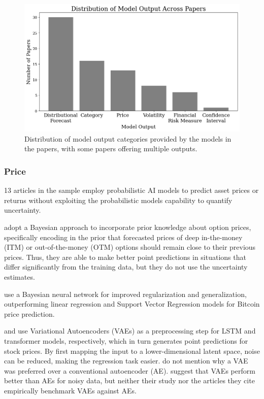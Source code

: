 \begin{figure}[H]
    \centering
    \includegraphics[width=1\linewidth]{Images/model_output.png}
    \caption[Distribution of model output categories in papers]{Distribution of model output categories provided by the models in the papers, with some papers offering multiple outputs.}
    \label{fig:model_output}
\end{figure}

\subsubsection{Price}
13 articles in the sample employ probabilistic AI models to predict asset prices or returns without exploiting the probabilistic models capability to quantify uncertainty.

\textcite{jang2018generative} adopt a Bayesian approach to incorporate prior knowledge about option prices, specifically encoding in the prior that forecasted prices of deep in-the-money (ITM) or out-of-the-money (OTM) options should remain close to their previous prices. Thus, they are able to make better point predictions in situations that differ significantly from the training data, but they do not use the uncertainty estimates.

\textcite{jang2018empirical} use a Bayesian neural network for improved regularization and generalization, outperforming linear regression and Support Vector Regression models for Bitcoin price prediction.

\textcite{choudhury2020enhancing} and \textcite{tang2024period} use Variational Autoencoders (VAEs) as a preprocessing step for LSTM and transformer models, respectively, which in turn generates point predictions for stock prices. By first mapping the input to a lower-dimensional latent space, noise can be reduced, making the regression task easier. \textcite{choudhury2020enhancing} do not mention why a VAE was preferred over a conventional autoencoder (AE). \textcite{tang2024period} suggest that VAEs perform better than AEs for noisy data, but neither their study nor the articles they cite empirically benchmark VAEs against AEs.

